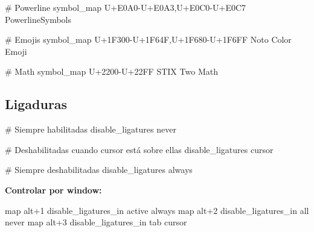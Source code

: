 \documentclass[
  doc,
  floatsintext,
  longtable,
  a4paper,
  nolmodern,
  notxfonts,
  notimes,
  12pt,
  colorlinks=true,linkcolor=blue,citecolor=blue,urlcolor=blue]{apa7}
\newenvironment{Shaded}{\begin{snugshade}}{\end{snugshade}}
\newcommand{\CommentTok}[1]{\textcolor[rgb]{0.37,0.37,0.37}{#1}}
\newcommand{\DataTypeTok}[1]{\textcolor[rgb]{0.68,0.00,0.00}{#1}}
\newcommand{\ErrorTok}[1]{\textcolor[rgb]{0.68,0.00,0.00}{#1}}
\begin{document}
\begin{Shaded}
\begin{Highlighting}[]
\CommentTok{\# Powerline}
\DataTypeTok{symbol\_map} \DataTypeTok{U}\ErrorTok{+}\DataTypeTok{E0A0{-}U}\ErrorTok{+}\DataTypeTok{E0A3}\ErrorTok{,}\DataTypeTok{U}\ErrorTok{+}\DataTypeTok{E0C0{-}U}\ErrorTok{+}\DataTypeTok{E0C7} \DataTypeTok{PowerlineSymbols}

\CommentTok{\# Emojis}
\DataTypeTok{symbol\_map} \DataTypeTok{U}\ErrorTok{+}\DataTypeTok{1F300{-}U}\ErrorTok{+}\DataTypeTok{1F64F}\ErrorTok{,}\DataTypeTok{U}\ErrorTok{+}\DataTypeTok{1F680{-}U}\ErrorTok{+}\DataTypeTok{1F6FF} \DataTypeTok{Noto} \DataTypeTok{Color} \DataTypeTok{Emoji}

\CommentTok{\# Math}
\DataTypeTok{symbol\_map} \DataTypeTok{U}\ErrorTok{+}\DataTypeTok{2200{-}U}\ErrorTok{+}\DataTypeTok{22FF} \DataTypeTok{STIX} \DataTypeTok{Two} \DataTypeTok{Math}
\end{Highlighting}
\end{Shaded}

\subsection{Ligaduras}\label{ligaduras}

\begin{Shaded}
\begin{Highlighting}[]
\CommentTok{\# Siempre habilitadas}
\DataTypeTok{disable\_ligatures} \DataTypeTok{never}

\CommentTok{\# Deshabilitadas cuando cursor está sobre ellas}
\DataTypeTok{disable\_ligatures} \DataTypeTok{cursor}

\CommentTok{\# Siempre deshabilitadas}
\DataTypeTok{disable\_ligatures} \DataTypeTok{always}
\end{Highlighting}
\end{Shaded}

\textbf{Controlar por window:}

\begin{Shaded}
\begin{Highlighting}[]
\DataTypeTok{map} \DataTypeTok{alt}\ErrorTok{+}\DataTypeTok{1} \DataTypeTok{disable\_ligatures\_in} \DataTypeTok{active} \DataTypeTok{always}
\DataTypeTok{map} \DataTypeTok{alt}\ErrorTok{+}\DataTypeTok{2} \DataTypeTok{disable\_ligatures\_in} \DataTypeTok{all} \DataTypeTok{never}
\DataTypeTok{map} \DataTypeTok{alt}\ErrorTok{+}\DataTypeTok{3} \DataTypeTok{disable\_ligatures\_in} \DataTypeTok{tab} \DataTypeTok{cursor}
\end{Highlighting}
\end{Shaded}
\end{document}
